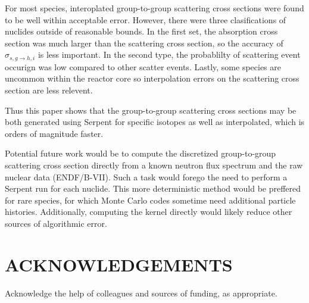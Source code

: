 \documentclass{physor2012}
\begin{document}
For most species, interoplated group-to-group scattering cross sections
were found to be well within acceptable error.  However, there were three
clasifications of nuclides outside of reasonable bounds. In the first set,
the absorption cross section was much larger than the scattering cross
section, so the accuracy of $\sigma_{s,g\to h,i}$ is less important. 
In the second type, the probablilty of scattering event occurign was low
compared to other scatter events.  Lastly, some species are uncommon within
the reactor core so interpolation errors on the scattering cross section
are less relevent.  

Thus this paper shows that the group-to-group scattering cross sections may be 
both generated using Serpent for specific isotopes as well as interpolated, 
which is orders of magnitude faster.

Potential future work would be to compute the discretized group-to-group 
scattering cross section directly from a known neutron flux spectrum and
the raw nuclear data (ENDF/B-VII).  Such a task would forego the need to 
perform a Serpent run for each nuclide.  This more deterministic method would 
be preffered for rare species, for which Monte Carlo codes sometime need 
additional particle histories.  Additionally, computing the kernel 
directly would likely reduce other sources of algorithmic error.


\section*{ACKNOWLEDGEMENTS}
%
Acknowledge the help of colleagues and sources of funding, as appropriate.


%
\setlength{\baselineskip}{12pt}


\end{document}
